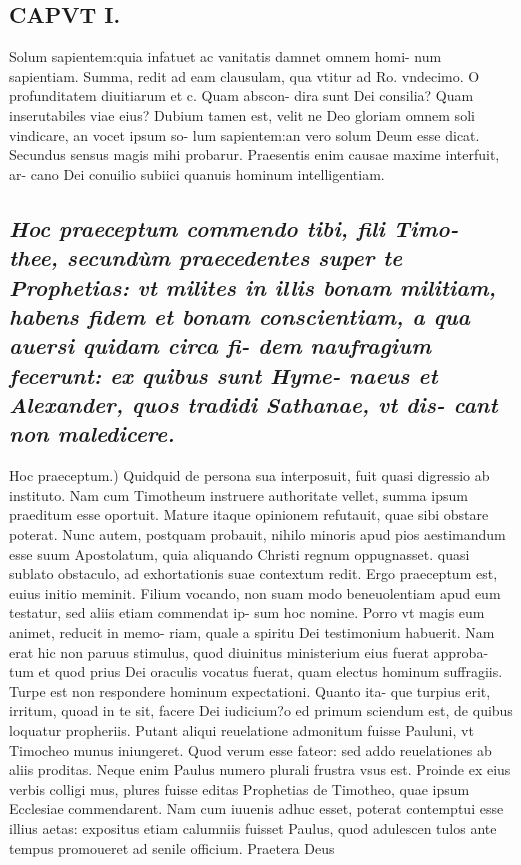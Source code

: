 \documentclass{article}
\begin{document}
\begin{pages}
\section*{CAPVT I. }
\marginpar{[ p.13 ]}\pstart Solum sapientem:quia infatuet ac vanitatis damnet omnem homi- num sapientiam. Summa, redit ad eam clausulam, qua vtitur ad Ro. vndecimo. O profunditatem diuitiarum et c. Quam abscon- dira sunt Dei consilia? Quam inserutabiles viae eius? Dubium tamen est, velit ne Deo gloriam omnem soli vindicare, an vocet ipsum so- lum sapientem:an vero solum Deum esse dicat. Secundus sensus magis mihi probarur. Praesentis enim causae maxime interfuit, ar- cano Dei conuilio subiici quanuis hominum intelligentiam.  \pend
{}
{}
\subsection*{\textit{Hoc praeceptum commendo tibi, fili Timo- thee, secundùm praecedentes super te Prophetias: vt milites in illis bonam militiam, habens fidem et bonam conscientiam, a qua auersi quidam circa fi- dem naufragium fecerunt: ex quibus sunt Hyme- naeus et Alexander, quos tradidi Sathanae, vt dis- cant non maledicere. }}\pstart Hoc praeceptum.) Quidquid de persona sua interposuit, fuit quasi digressio ab instituto. Nam cum Timotheum instruere authoritate vellet, summa ipsum praeditum esse oportuit. Mature itaque opinionem refutauit, quae sibi obstare poterat. Nunc autem, postquam probauit, nihilo minoris apud pios aestimandum esse suum Apostolatum, quia aliquando Christi regnum oppugnasset. quasi sublato obstaculo, ad exhortationis suae contextum redit. Ergo praeceptum est, euius initio meminit. Filium vocando, non suam modo beneuolentiam apud eum testatur, sed aliis etiam commendat ip- sum hoc nomine. Porro vt magis eum animet, reducit in memo- riam, quale a spiritu Dei testimonium habuerit. Nam erat hic non paruus stimulus, quod diuinitus ministerium eius fuerat approba- tum et quod prius Dei oraculis vocatus fuerat, quam electus hominum suffragiis. Turpe est non respondere hominum expectationi. Quanto ita- que turpius erit, irritum, quoad in te sit, facere Dei iudicium?o ed primum sciendum est, de quibus loquatur propheriis. Putant aliqui reuelatione admonitum fuisse Pauluni, vt Timocheo munus iniungeret. Quod verum esse fateor: sed addo reuelationes ab aliis proditas. Neque enim Paulus numero plurali frustra vsus est. Proinde ex eius verbis colligi mus, plures fuisse editas Prophetias de Timotheo, quae ipsum Ecclesiae commendarent. Nam cum iuuenis adhuc esset, poterat contemptui esse illius aetas: expositus etiam calumniis fuisset Paulus, quod adulescen tulos ante tempus promoueret ad senile officium. Praetera Deus  \pend

\end{pages}
\end{document}
